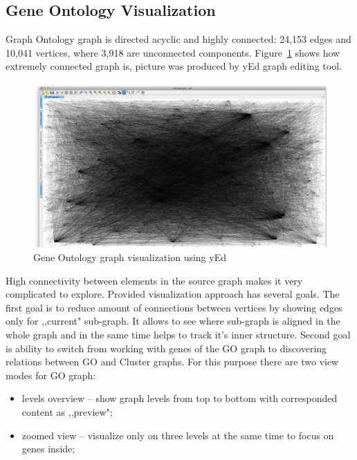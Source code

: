 \subsection{Gene Ontology Visualization}
\label{sec:go}

Graph Ontology graph is directed acyclic and highly connected: 24,153 edges and 10,041 vertices, where 3,918 are unconnected components. Figure~\ref{fig:go_connections_yEd} shows how extremely connected graph is, picture was produced by yEd graph editing tool.

\begin{figure}
\centering
\includegraphics[scale=0.2]{pictures/yEd_GO_2.png}
\caption{Gene Ontology graph visualization using yEd}
\label{fig:go_connections_yEd}
\end{figure}

High connectivity between elements in the source graph makes it very complicated to explore. Provided visualization approach has several goals. The first goal is to reduce amount of connections between vertices by showing edges only for ,,current" sub-graph. It allows to see where sub-graph is aligned in the whole graph and in the same time helps to track it's inner structure. Second goal is ability to switch from working with genes of the GO graph to discovering relations between GO and Cluster graphs. For this purpose there are two view modes for GO graph:

\begin{itemize}
   \item levels overview -- show graph levels from top to bottom with corresponded content as ,,preview";
   \item zoomed view -- visualize only on three levels at the same time to focus on genes inside;
\end{itemize}

